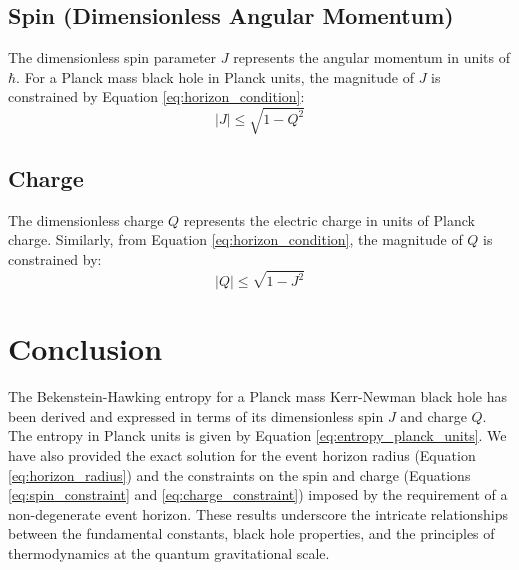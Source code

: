 	\subsection{Spin (Dimensionless Angular Momentum)}
	
	The dimensionless spin parameter $J$ represents the angular momentum in units of $\hbar$. For a Planck mass black hole in Planck units, the magnitude of $J$ is constrained by Equation \eqref{eq:horizon_condition}:
	\begin{equation}
		|J| \le \sqrt{1 - Q^2}
		\label{eq:spin_constraint}
	\end{equation}
	
	\subsection{Charge}
	
	The dimensionless charge $Q$ represents the electric charge in units of Planck charge. Similarly, from Equation \eqref{eq:horizon_condition}, the magnitude of $Q$ is constrained by:
	\begin{equation}
		|Q| \le \sqrt{1 - J^2}
		\label{eq:charge_constraint}
	\end{equation}
	
	\section{Conclusion}
	
	The Bekenstein-Hawking entropy for a Planck mass Kerr-Newman black hole has been derived and expressed in terms of its dimensionless spin $J$ and charge $Q$. The entropy in Planck units is given by Equation \eqref{eq:entropy_planck_units}. We have also provided the exact solution for the event horizon radius (Equation \eqref{eq:horizon_radius}) and the constraints on the spin and charge (Equations \eqref{eq:spin_constraint} and \eqref{eq:charge_constraint}) imposed by the requirement of a non-degenerate event horizon. These results underscore the intricate relationships between the fundamental constants, black hole properties, and the principles of thermodynamics at the quantum gravitational scale.
	
